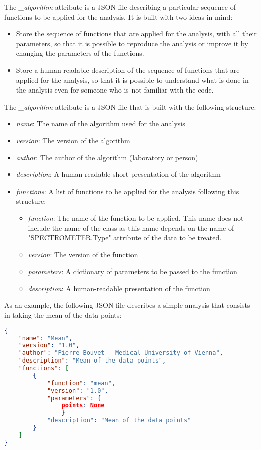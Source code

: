 The \textit{\_algorithm} attribute is a JSON file describing a particular sequence of functions to be applied for the analysis. It is built with two ideas in mind:
\begin{itemize}
    \item Store the sequence of functions that are applied for the analysis, with all their parameters, so that it is possible to reproduce the analysis or improve it by changing the parameters of the functions.
    \item Store a human-readable description of the sequence of functions that are applied for the analysis, so that it is possible to understand what is done in the analysis even for someone who is not familiar with the code.
\end{itemize}

The \textit{\_algorithm} attribute is a JSON file that is built with the following structure:
\begin{itemize}
    \item \textit{name}: The name of the algorithm used for the analysis
    \item \textit{version}: The version of the algorithm
    \item \textit{author}: The author of the algorithm (laboratory or person)
    \item \textit{description}: A human-readable short presentation of the algorithm
    \item \textit{functions}: A list of functions to be applied for the analysis following this structure:
    \begin{itemize}
        \item \textit{function}: The name of the function to be applied. This name does not include the name of the class as this name depends on the name of "SPECTROMETER.Type" attribute of the data to be treated.
        \item \textit{version}: The version of the function
        \item \textit{parameters}: A dictionary of parameters to be passed to the function
        \item \textit{description}: A human-readable presentation of the function
    \end{itemize}
\end{itemize}

As an example, the following JSON file describes a simple analysis that consists in taking the mean of the data points:

\begin{lstlisting}[language=json]
{
    "name": "Mean",
    "version": "1.0",
    "author": "Pierre Bouvet - Medical University of Vienna",
    "description": "Mean of the data points",
    "functions": [
        {
            "function": "mean",
            "version": "1.0",
            "parameters": {
                points: None
                }
            "description": "Mean of the data points"
        }
    ]
}
\end{lstlisting}

